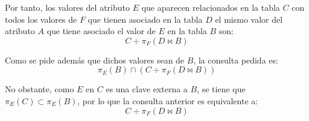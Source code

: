 \documentclass[12pt]{article}
\begin{document}
\begin{ejercicio}[AR]
    Por tanto, los valores del atributo $E$ que aparecen relacionados en la tabla $C$ con todos los valores de $F$ que tienen asociado en la tabla $D$ el mismo valor del atributo $A$ que tiene asociado el valor de $E$ en la tabla $B$ son:
    \begin{equation*}
        C \div \pi_F(D \bowtie B)
    \end{equation*}

    Como se pide además que dichos valores sean de $B$, la consulta pedida es:
    \begin{equation*}
        \pi_E(B) \cap \left( C \div \pi_F(D \bowtie B) \right)
    \end{equation*}

    No obstante, como $E$ en $C$ es una clave externa a $B$, se tiene que $\pi_E(C)\subset \pi_E(B)$, por lo que la consulta anterior es equivalente a:
    \begin{equation*}
        C \div \pi_F(D \bowtie B)
    \end{equation*}
\end{ejercicio}
\end{document}
